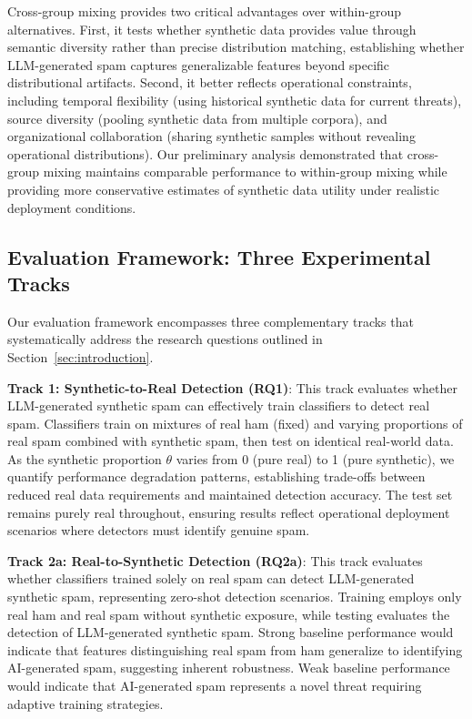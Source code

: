 Cross-group mixing provides two critical advantages over within-group alternatives. First, it tests whether synthetic data provides value through semantic diversity rather than precise distribution matching, establishing whether LLM-generated spam captures generalizable features beyond specific distributional artifacts. Second, it better reflects operational constraints, including temporal flexibility (using historical synthetic data for current threats), source diversity (pooling synthetic data from multiple corpora), and organizational collaboration (sharing synthetic samples without revealing operational distributions). Our preliminary analysis demonstrated that cross-group mixing maintains comparable performance to within-group mixing while providing more conservative estimates of synthetic data utility under realistic deployment conditions\footnotemark[2].

\subsection{Evaluation Framework: Three Experimental Tracks}
Our evaluation framework encompasses three complementary tracks that systematically address the research questions outlined in Section~\ref{sec:introduction}. 


\textbf{Track 1: Synthetic-to-Real Detection (RQ1)}: This track evaluates whether LLM-generated synthetic spam can effectively train classifiers to detect real spam. Classifiers train on mixtures of real ham (fixed) and varying proportions of real spam combined with synthetic spam, then test on identical real-world data. As the synthetic proportion $\theta$ varies from 0 (pure real) to 1 (pure synthetic), we quantify performance degradation patterns, establishing trade-offs between reduced real data requirements and maintained detection accuracy. The test set remains purely real throughout, ensuring results reflect operational deployment scenarios where detectors must identify genuine spam.

\textbf{Track 2a: Real-to-Synthetic Detection (RQ2a)}: This track evaluates whether classifiers trained solely on real spam can detect LLM-generated synthetic spam, representing zero-shot detection scenarios. Training employs only real ham and real spam without synthetic exposure, while testing evaluates the detection of LLM-generated synthetic spam. Strong baseline performance would indicate that features distinguishing real spam from ham generalize to identifying AI-generated spam, suggesting inherent robustness. Weak baseline performance would indicate that AI-generated spam represents a novel threat requiring adaptive training strategies.

